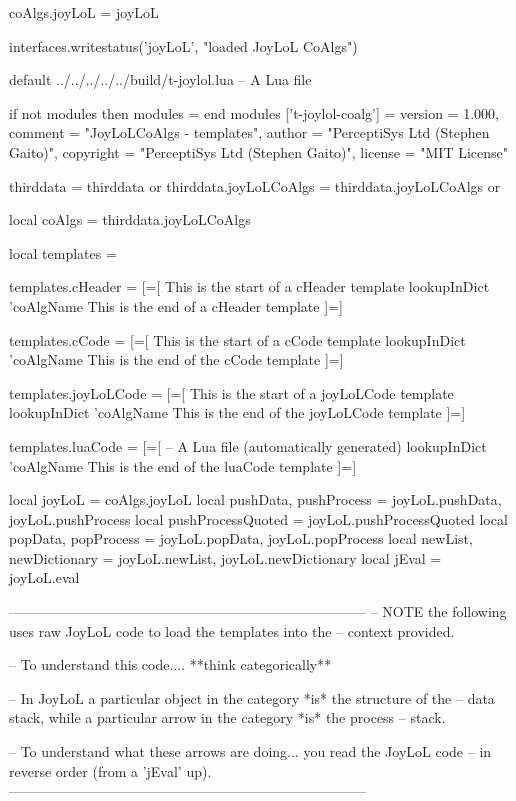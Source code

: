 coAlgs.joyLoL = joyLoL

interfaces.writestatus('joyLoL', "loaded JoyLoL CoAlgs")
\stopLuaCode

\createLuaCodeFile%
  {default}%
  {../../../../../build/t-joylol.lua}%
  {-- A Lua file}

\startLuaTemplate
if not modules then modules = { } end modules ['t-joylol-coalg'] = {
    version   = 1.000,
    comment   = "JoyLoLCoAlgs - templates",
    author    = "PerceptiSys Ltd (Stephen Gaito)",
    copyright = "PerceptiSys Ltd (Stephen Gaito)",
    license   = "MIT License"
}

thirddata              = thirddata              or {}
thirddata.joyLoLCoAlgs = thirddata.joyLoLCoAlgs or {}

local coAlgs     = thirddata.joyLoLCoAlgs

local templates  = { }

templates.cHeader = [=[
This is the start of a cHeader template
{{ lookupInDict 'coAlgName }}
This is the end of a cHeader template
]=]

templates.cCode = [=[
This is the start of a cCode template
{{ lookupInDict 'coAlgName }}
This is the end of the cCode template
]=]

templates.joyLoLCode = [=[
This is the start of a joyLoLCode template
{{ lookupInDict 'coAlgName }}
This is the end of the joyLoLCode template
]=]

templates.luaCode = [=[
-- A Lua file (automatically generated)
{{ lookupInDict 'coAlgName }}
This is the end of the luaCode template
]=]

local joyLoL = coAlgs.joyLoL
local pushData, pushProcess = joyLoL.pushData, joyLoL.pushProcess
local pushProcessQuoted = joyLoL.pushProcessQuoted
local popData, popProcess   = joyLoL.popData, joyLoL.popProcess
local newList, newDictionary = joyLoL.newList, joyLoL.newDictionary
local jEval = joyLoL.eval

-----------------------------------------------------------------------------
-- NOTE the following uses raw JoyLoL code to load the templates into the 
-- context provided. 

-- To understand this code.... **think categorically**

-- In JoyLoL a particular object in the category *is* the structure of the 
-- data stack, while a particular arrow in the category *is* the process 
-- stack.

-- To understand what these arrows are doing... you read the JoyLoL code 
-- in reverse order (from a 'jEval' up). 
-----------------------------------------------------------------------------

